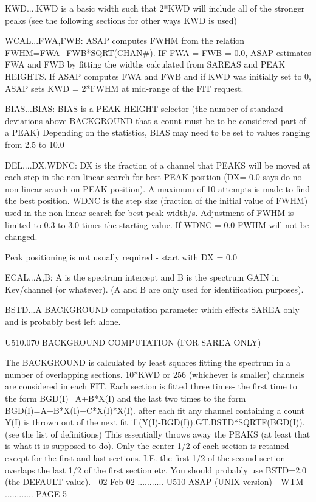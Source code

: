    KWD....KWD  is  a  basic  width  such  that  2*KWD  will include all of the
          stronger peaks (see the following sections for  other  ways  KWD  is
          used)
 
   WCAL...FWA,FWB:    ASAP     computes     FWHM     from     the     relation
          FWHM=FWA+FWB*SQRT(CHAN#).  IF  FWA  =  FWB = 0.0, ASAP estimates FWA
          and FWB by fitting  the  widths  calculated  from  SAREAS  and  PEAK
          HEIGHTS.  If  ASAP computes FWA and FWB and if KWD was initially set
          to 0, ASAP sets KWD = 2*FWHM at mid-range of the FIT request.
 
   BIAS...BIAS: BIAS is  a  PEAK  HEIGHT  selector  (the  number  of  standard
          deviations  above   BACKGROUND that a count must be to be considered
          part of a PEAK) Depending on the statistics, BIAS  may  need  to  be
          set to values ranging from 2.5 to 10.0
 
   DEL....DX,WDNC:  DX  is  the fraction of a channel that PEAKS will be moved
          at each step in the non-linear-search for best  PEAK  position  (DX=
          0.0  says do no non-linear search on PEAK position). A maximum of 10
          attempts is made to find the best position. WDNC is  the  step  size
          (fraction  of  the  initial  value  of  FWHM) used in the non-linear
          search for best peak width/s. Adjustment of FWHM is limited  to  0.3
          to  3.0  times  the  starting value. If WDNC = 0.0  FWHM will not be
          changed.
 
   Peak positioning is not usually required - start with DX = 0.0
 
   ECAL...A,B: A is the spectrum intercept and  B  is  the  spectrum  GAIN  in
          Kev/channel  (or  whatever).  (A   and   B   are   only   used   for
          identification purposes).
 
   BSTD...A  BACKGROUND  computation parameter which effects SAREA only and is
          probably best left alone.
 
   U510.070  BACKGROUND COMPUTATION (FOR SAREA ONLY)
 
   The BACKGROUND is calculated by least squares fitting  the  spectrum  in  a
   number  of  overlapping  sections.  10*KWD  or  256  (whichever is smaller)
   channels are considered in each FIT. Each section is  fitted  three  times-
   the  first  time  to the form BGD(I)=A+B*X(I) and the last two times to the
   form BGD(I)=A+B*X(I)+C*X(I)*X(I). after each fit any channel  containing  a
   count    Y(I)    is    thrown    out     of     the     next     fit     if
   (Y(I)-BGD(I)).GT.BSTD*SQRTF(BGD(I)).  (see  the  list  of definitions) This
   essentially throws away the PEAKS (at least that is what it is supposed  to
   do).  Only  the center 1/2 of each section is retained except for the first
   and last sections. I.E. the first 1/2 of the second  section  overlaps  the
   last  1/2  of  the first section etc. You should probably use BSTD=2.0 (the
   DEFAULT value).
    
   02-Feb-02 ........... U510  ASAP (UNIX version) - WTM ............ PAGE   5
 
